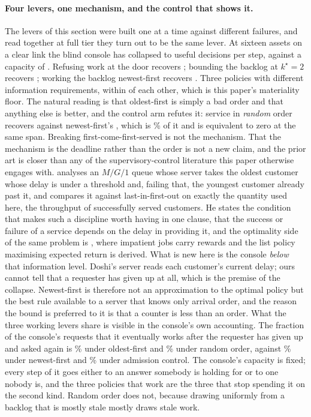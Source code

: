 \documentclass[11pt]{article}
\begin{document}
\paragraph{Four levers, one mechanism, and the control that shows it.} The levers of this section
were built one at a time against different failures, and read together at full tier they turn out to
be the same lever. At sixteen assets on a clear link the blind console has collapsed to \LvSrvFifo{}
useful decisions per step, against a capacity of \LvMu{}. Refusing work at the door recovers
\LvSrvAdmit{}; bounding the backlog at $k^{\star} = 2$ recovers \LvSrvBound{}; working the backlog
newest-first recovers \LvSrvLifo{}. Three policies with different information requirements, within
\LvMPE{} of each other, which is this paper's materiality floor. The natural reading is that
oldest-first is simply a bad order and that anything else is better, and the control arm refutes it:
service in \emph{random} order recovers \LvRandGain{} against newest-first's \LvLifoGain{}, which is
\LvRandShare\% of it and is equivalent to zero at the same span. Breaking first-come-first-served is
not the mechanism. That the mechanism is the deadline rather than the order is not a new claim, and
the prior art is closer than any of the supervisory-control literature this paper otherwise engages
with. \citet{doshi1983hybrid} analyses an $M/G/1$ queue whose server takes the oldest customer whose
delay is under a threshold and, failing that, the youngest customer already past it, and compares it
against last-in-first-out on exactly the quantity used here, the throughput of successfully served
customers. He states the condition that makes such a discipline worth having in one clause, that the
success or failure of a service depends on the delay in providing it, and the optimality side of the
same problem is \citet{ross2015sequential}, where impatient jobs carry rewards and the list policy
maximising expected return is derived. What is new here is the console \emph{below} that information
level. Doshi's server reads each customer's current delay; ours cannot tell that a requester has
given up at all, which is the premise of the collapse. Newest-first is therefore not an
approximation to the optimal policy but the best rule available to a server that knows only arrival
order, and the reason the bound is preferred to it is that a counter is less than an order. What the three working levers share is visible in the console's own accounting.
The fraction of the console's requests that it eventually works after the requester has given up and
asked again is \LvStaleFifo\% under oldest-first and \LvStaleRand\% under random order, against
\LvStaleLifo\% under newest-first and \LvStaleAdmit\% under admission control. The console's capacity
is fixed; every step of it goes either to an answer somebody is holding for or to one nobody is, and
the three policies that work are the three that stop spending it on the second kind. Random order
does not, because drawing uniformly from a backlog that is mostly stale mostly draws stale work.
\end{document}
